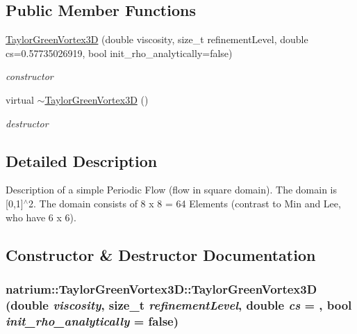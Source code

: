 \subsection*{Public Member Functions}
\begin{DoxyCompactItemize}
\item 
\hyperlink{classnatrium_1_1TaylorGreenVortex3D_a8d6071197520b6fb7766132318a15029}{TaylorGreenVortex3D} (double viscosity, size\_\-t refinementLevel, double cs=0.57735026919, bool init\_\-rho\_\-analytically=false)
\begin{DoxyCompactList}\small\item\em constructor \item\end{DoxyCompactList}\item 
\hypertarget{classnatrium_1_1TaylorGreenVortex3D_a1cc6d70f1b2610383f81b8d1109b6ae9}{
virtual \hyperlink{classnatrium_1_1TaylorGreenVortex3D_a1cc6d70f1b2610383f81b8d1109b6ae9}{$\sim$TaylorGreenVortex3D} ()}
\label{classnatrium_1_1TaylorGreenVortex3D_a1cc6d70f1b2610383f81b8d1109b6ae9}

\begin{DoxyCompactList}\small\item\em destructor \item\end{DoxyCompactList}\end{DoxyCompactItemize}


\subsection{Detailed Description}
Description of a simple Periodic Flow (flow in square domain). The domain is \mbox{[}0,1\mbox{]}$^\wedge$2. The domain consists of 8 x 8 = 64 Elements (contrast to Min and Lee, who have 6 x 6). 

\subsection{Constructor \& Destructor Documentation}
\hypertarget{classnatrium_1_1TaylorGreenVortex3D_a8d6071197520b6fb7766132318a15029}{
\subsubsection[{TaylorGreenVortex3D}]{\setlength{\rightskip}{0pt plus 5cm}natrium::TaylorGreenVortex3D::TaylorGreenVortex3D (double {\em viscosity}, \/  size\_\-t {\em refinementLevel}, \/  double {\em cs} = {}, \/  bool {\em init\_\-rho\_\-analytically} = {\ttfamily false})}}
\label{classnatrium_1_1TaylorGreenVortex3D_a8d6071197520b6fb7766132318a15029}


